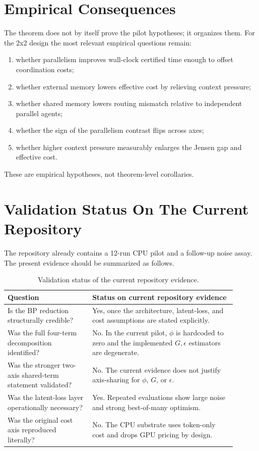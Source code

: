 \documentclass[11pt]{article}
\begin{document}
\section{Empirical Consequences}

The theorem does not by itself prove the pilot hypotheses; it organizes them.
For the 2x2 design the most relevant empirical questions remain:

\begin{enumerate}
\item whether parallelism improves wall-clock certified time enough to offset coordination costs;
\item whether external memory lowers effective cost by relieving context pressure;
\item whether shared memory lowers routing mismatch relative to independent parallel agents;
\item whether the sign of the parallelism contrast flips across axes;
\item whether higher context pressure measurably enlarges the Jensen gap and effective cost.
\end{enumerate}

These are empirical hypotheses, not theorem-level corollaries.

\section{Validation Status On The Current Repository}

The repository already contains a 12-run CPU pilot and a follow-up noise assay.
The present evidence should be summarized as follows.

\begin{table}[h]
\centering
\begin{tabular}{p{0.33\linewidth} p{0.57\linewidth}}
\toprule
Question & Status on current repository evidence \\
\midrule
Is the BP reduction structurally credible? &
Yes, once the architecture, latent-loss, and cost assumptions are stated explicitly. \\
\addlinespace
Was the full four-term decomposition identified? &
No. In the current pilot, $\phi$ is hardcoded to zero and the implemented $G,\epsilon$ estimators are degenerate. \\
\addlinespace
Was the stronger two-axis shared-term statement validated? &
No. The current evidence does not justify axis-sharing for $\phi$, $G$, or $\epsilon$. \\
\addlinespace
Was the latent-loss layer operationally necessary? &
Yes. Repeated evaluations show large noise and strong best-of-many optimism. \\
\addlinespace
Was the original cost axis reproduced literally? &
No. The CPU substrate uses token-only cost and drops GPU pricing by design. \\
\bottomrule
\end{tabular}
\caption{Validation status of the current repository evidence.}
\end{table}
\end{document}
